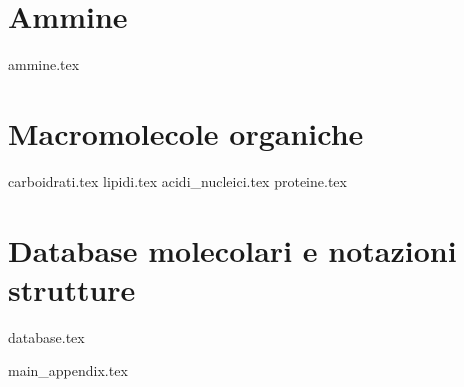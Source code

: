 \documentclass[
    a4paper,
    12pt,
    oneside,
    ]{book} %
\begin{document}

\part{Ammine} %
{ammine.tex}

\part{Macromolecole organiche}
{carboidrati.tex} %
{lipidi.tex} %
{acidi_nucleici.tex} %
{proteine.tex} %

\part{Database molecolari e notazioni strutture}
{database.tex} %

\backmatter
{main_appendix.tex}


\printbibliography




\end{document}
